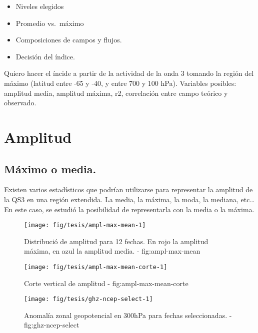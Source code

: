 \documentclass[spanish,a4paper]{book}
\providecommand{\tightlist}{%
  \setlength{\itemsep}{0pt}\setlength{\parskip}{0pt}}
\begin{document}
\begin{itemize}
\tightlist
\item
  Niveles elegidos
\item
  Promedio vs.~máximo
\item
  Composiciones de campos y flujos.
\item
  Decisión del índice.
\end{itemize}

Quiero hacer el íncide a partir de la actividad de la onda 3 tomando la
región del máximo (latitud entre -65 y -40, y entre 700 y 100 hPa).
Variables posibles: amplitud media, amplitud máxima, r2, correlación
entre campo teórico y observado.

\section{Amplitud}\label{amplitud}

\subsection{Máximo o media.}\label{maximo-o-media.}

Existen varios estadísticos que podrían utilizarse para representar la
amplitud de la QS3 en una región extendida. La media, la máxima, la
moda, la mediana, etc\ldots{} En este caso, se estudió la posibilidad de
representarla con la media o la
máxima.

\begin{figure*}
\texttt{[image: fig/tesis/ampl-max-mean-1]} \caption{Distribució de amplitud para 12 fechas. En rojo la amplitud máxima, en azul la amplitud media. - fig:ampl-max-mean}\label{fig:ampl-max-mean}
\end{figure*}

\begin{figure*}
\texttt{[image: fig/tesis/ampl-max-mean-corte-1]} \caption{Corte vertical de amplitud - fig:ampl-max-mean-corte}\label{fig:ampl-max-mean-corte}
\end{figure*}

\begin{figure*}
\texttt{[image: fig/tesis/ghz-ncep-select-1]} \caption{Anomalía zonal geopotencial en 300hPa para fechas seleccionadas. - fig:ghz-ncep-select}\label{fig:ghz-ncep-select}
\end{figure*}
\end{document}
